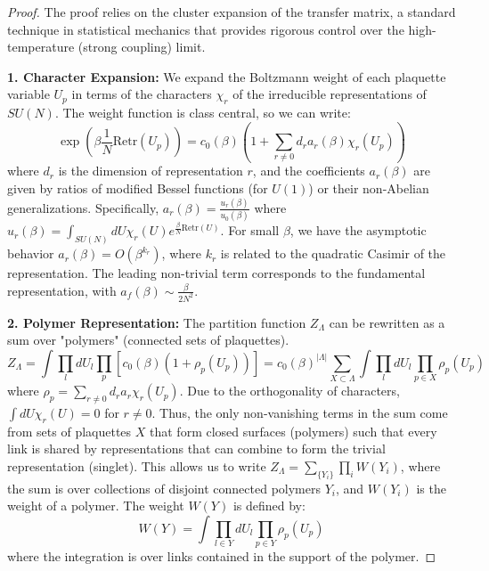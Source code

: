 \begin{proof}
The proof relies on the cluster expansion of the transfer matrix, a standard technique in statistical mechanics that provides rigorous control over the high-temperature (strong coupling) limit.

\textbf{1. Character Expansion:}
We expand the Boltzmann weight of each plaquette variable $U_p$ in terms of the characters $\chi_r$ of the irreducible representations of $SU(N)$. The weight function is class central, so we can write:
\begin{equation}
\exp\left(\beta \frac{1}{N} \text{Re} \text{tr}(U_p)\right) = c_0(\beta) \left( 1 + \sum_{r \neq 0} d_r a_r(\beta) \chi_r(U_p) \right)
\end{equation}
where $d_r$ is the dimension of representation $r$, and the coefficients $a_r(\beta)$ are given by ratios of modified Bessel functions (for $U(1)$) or their non-Abelian generalizations. Specifically, $a_r(\beta) = \frac{u_r(\beta)}{u_0(\beta)}$ where $u_r(\beta) = \int_{SU(N)} dU \chi_r(U) e^{\frac{\beta}{N} \text{Re} \text{tr}(U)}$. For small $\beta$, we have the asymptotic behavior $a_r(\beta) = O(\beta^{k_r})$, where $k_r$ is related to the quadratic Casimir of the representation. The leading non-trivial term corresponds to the fundamental representation, with $a_f(\beta) \sim \frac{\beta}{2N^2}$.

\textbf{2. Polymer Representation:}
The partition function $Z_\Lambda$ can be rewritten as a sum over "polymers" (connected sets of plaquettes).
\begin{equation}
Z_\Lambda = \int \prod_l dU_l \prod_p \left[ c_0(\beta) \left( 1 + \rho_p(U_p) \right) \right] = c_0(\beta)^{|\Lambda|} \sum_{X \subset \Lambda} \int \prod_l dU_l \prod_{p \in X} \rho_p(U_p)
\end{equation}
where $\rho_p = \sum_{r \neq 0} d_r a_r \chi_r(U_p)$. Due to the orthogonality of characters, $\int dU \chi_r(U) = 0$ for $r \neq 0$. Thus, the only non-vanishing terms in the sum come from sets of plaquettes $X$ that form closed surfaces (polymers) such that every link is shared by representations that can combine to form the trivial representation (singlet).
This allows us to write $Z_\Lambda = \sum_{\{Y_i\}} \prod_i W(Y_i)$, where the sum is over collections of disjoint connected polymers $Y_i$, and $W(Y_i)$ is the weight of a polymer.
The weight $W(Y)$ is defined by:
\begin{equation}
W(Y) = \int \prod_{l \in Y} dU_l \prod_{p \in Y} \rho_p(U_p)
\end{equation}
where the integration is over links contained in the support of the polymer.


\end{proof}
